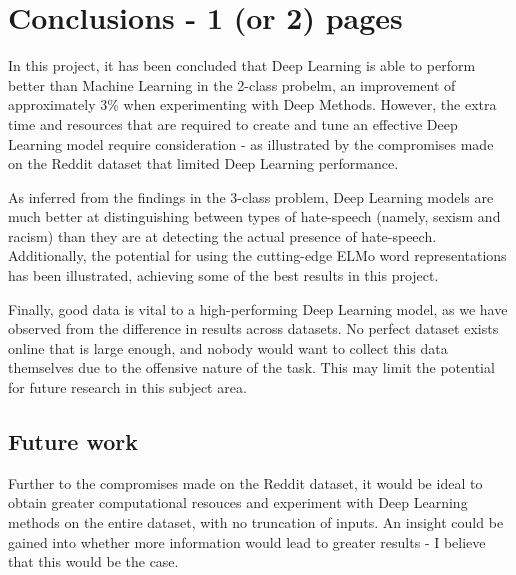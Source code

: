 \documentclass[12pt,a4paper]{article}
\begin{document}
\section{Conclusions - 1 (or 2) pages}
In this project, it has been concluded that Deep Learning is able to perform better than Machine Learning in the 2-class probelm, an improvement of approximately 3\% when experimenting with Deep Methods. However, the extra time and resources that are required to create and tune an effective Deep Learning model require consideration - as illustrated by the compromises made on the Reddit dataset that limited Deep Learning performance. 

As inferred from the findings in the 3-class problem, Deep Learning models are much better at distinguishing between types of hate-speech (namely, sexism and racism) than they are at detecting the actual presence of hate-speech. Additionally, the potential for using the cutting-edge ELMo word representations has been illustrated, achieving some of the best results in this project.

Finally, good data is vital to a high-performing Deep Learning model, as we have observed from the difference in results across datasets. No perfect dataset exists online that is large enough, and nobody would want to collect this data themselves due to the offensive nature of the task. This may limit the potential for future research in this subject area.

\subsection{Future work}
Further to the compromises made on the Reddit dataset, it would be ideal to obtain greater computational resouces and experiment with Deep Learning methods on the entire dataset, with no truncation of inputs. An insight could be gained into whether more information would lead to greater results - I believe that this would be the case.
\end{document}
